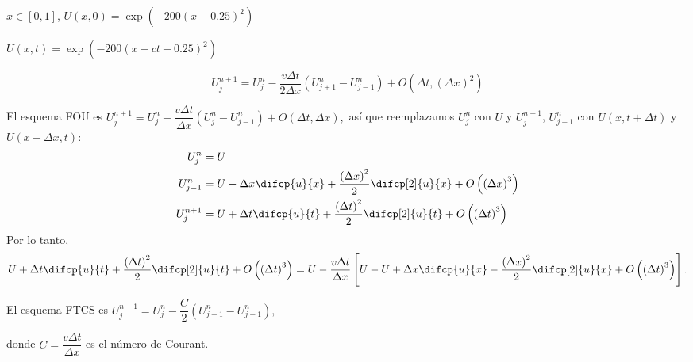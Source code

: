 $x\in\left[0,1\right]$, $U\left(x,0\right)=\exp\left(-200{\left(x-0.25\right)}^{2}\right)$

$U\left(x,t\right)=\exp\left(-200{\left(x-ct-0.25\right)}^{2}\right)$

\begin{example}
    \begin{equation*}
        U^{n+1}_{j}=
        U^{n}_{j}-
        \dfrac{v\Delta t}{2\Delta x}
        \left(U^{n}_{j+1}-U^{n}_{j-1}\right)+
        O\left(\Delta t,{\left(\Delta x\right)}^{2}\right)
    \end{equation*}
\end{example}

El esquema FOU es
\begin{math}
    U^{n+1}_{j}=
    U^{n}_{j}-
    \dfrac{v\Delta t}{\Delta x}
    \left(U^{n}_{j}-U^{n}_{j-1}\right)+
    O\left(\Delta t,\Delta x\right),
\end{math}
así que reemplazamos $U^{n}_{j}$ con $U$ y $U^{n+1}_{j}$, $U^{n}_{j-1}$ con $U\left(x, t+\Delta t\right)$ y $U\left(x-\Delta x, t\right)$:
\begin{align*}
    U^{n}_{j}   & =
    U                                         \\
    U^{n}_{j-1} & =
    U-
    \Delta x\difcp{u}{x}+
    \dfrac{{\left(\Delta x\right)}^{2}}{2}
    \difcp[2]{u}{x}+
    O\left({\left(\Delta x\right)}^{3}\right) \\
    U^{n+1}_{j} & =
    U+
    \Delta t\difcp{u}{t}+
    \dfrac{{\left(\Delta t\right)}^{2}}{2}
    \difcp[2]{u}{t}+
    O\left({\left(\Delta t\right)}^{3}\right)
\end{align*}
Por lo tanto,
\begin{equation*}
    U+
    \Delta t\difcp{u}{t}+
    \dfrac{{\left(\Delta t\right)}^{2}}{2}
    \difcp[2]{u}{t}+
    O\left({\left(\Delta t\right)}^{3}\right)=
    U-
    \dfrac{v\Delta t}{\Delta x}
    \left[
        U-
        U+
        \Delta x \difcp{u}{x}-
        \dfrac{{\left(\Delta x\right)}^{2}}{2}\difcp[2]{u}{x}+
        O\left({\left(\Delta t\right)}^{3}\right)
        \right].
\end{equation*}

El esquema FTCS es
\begin{math}
    U^{n+1}_{j}=
    U^{n}_{j}-
    \dfrac{C}{2}
    \left(U^{n}_{j+1}-U^{n}_{j-1}\right),
\end{math}

donde $C=\dfrac{v\Delta t}{\Delta x}$ es el número de Courant.


